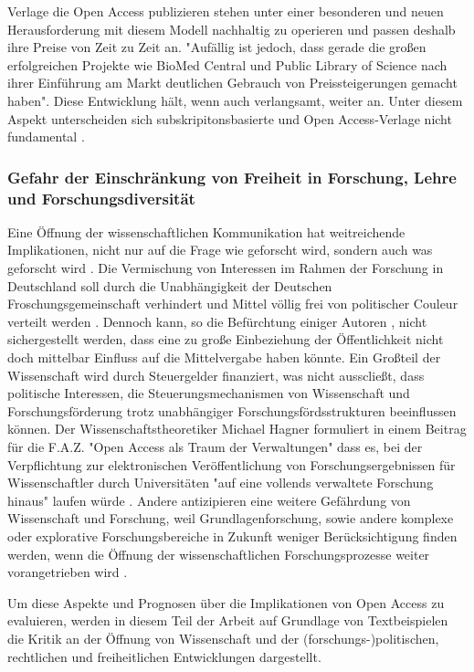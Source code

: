 Verlage die Open Access publizieren stehen unter einer besonderen und neuen Herausforderung mit diesem Modell nachhaltig zu operieren und passen deshalb ihre Preise von Zeit zu Zeit an. "Aufällig ist jedoch, dass gerade die großen erfolgreichen Projekte wie BioMed Central und Public Library of Science nach ihrer Einführung am Markt deutlichen Gebrauch von Preissteigerungen gemacht haben"\cite{schmidt_2007_goldenen}. Diese Entwicklung hält, wenn auch verlangsamt, weiter an\cite{suchen}. Unter diesem Aspekt unterscheiden sich subskripitonsbasierte und Open Access-Verlage nicht fundamental \cite{schmidt_2007_goldenen}.

\subsubsection{Gefahr der Einschränkung von Freiheit in Forschung, Lehre und Forschungsdiversität}

Eine Öffnung der wissenschaftlichen Kommunikation hat weitreichende Implikationen, nicht nur auf die Frage wie geforscht wird, sondern auch was geforscht wird \cite{suchen}. Die Vermischung von Interessen im Rahmen der Forschung in Deutschland soll durch die Unabhängigkeit der Deutschen Froschungsgemeinschaft verhindert und Mittel völlig frei von politischer Couleur verteilt werden \cite{suchen}. Dennoch kann, so die Befürchtung einiger Autoren \cite{suchen}, nicht sichergestellt werden, dass eine zu große Einbeziehung der Öffentlichkeit nicht doch mittelbar Einfluss auf die Mittelvergabe haben könnte. Ein Großteil der Wissenschaft wird durch Steuergelder finanziert, was nicht ausscließt, dass politische Interessen, die Steuerungsmechanismen von Wissenschaft und Forschungsförderung trotz unabhängiger Forschungsfördsstrukturen beeinflussen können. Der Wissenschaftstheoretiker Michael Hagner formuliert in einem Beitrag für die F.A.Z. "Open Access als Traum der Verwaltungen" dass es, bei der Verpflichtung zur elektronischen Veröffentlichung von Forschungsergebnissen für Wissenschaftler durch Universitäten "auf eine vollends verwaltete Forschung hinaus" laufen würde \cite{suchen}. Andere antizipieren eine weitere Gefährdung von Wissenschaft und Forschung, weil Grundlagenforschung, sowie andere komplexe oder explorative Forschungsbereiche in Zukunft weniger Berücksichtigung finden werden, wenn die Öffnung der wissenschaftlichen Forschungsprozesse weiter vorangetrieben wird \cite{suchen} \cite{suchen} \cite{suchen}. 

Um diese Aspekte und Prognosen über die Implikationen von Open Access zu evaluieren, werden in diesem Teil der Arbeit auf Grundlage von Textbeispielen die Kritik an der Öffnung von Wissenschaft und der (forschungs-)politischen, rechtlichen und freiheitlichen Entwicklungen dargestellt.

